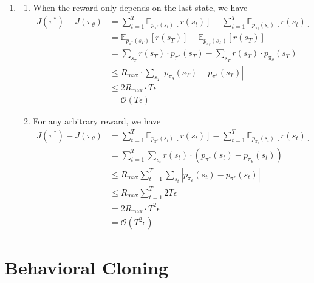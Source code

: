 \documentclass[12pt]{article}
\newcommand{\E}{\mathbb{E}}
\newcommand\abs[1]{\left| #1 \right|} %
\begin{document}
\begin{enumerate}
    \item \begin{enumerate}
      \item When the reward only depends on the last state, we have 
      \begin{align*}
        J(\pi^*) - J(\pi_\theta) &= \sum_{t=1}^T \E_{p_{\pi^*}(s_t)}[r(s_t)] - \sum_{t=1}^T \E_{p_{\pi_\theta}(s_t)}[r(s_t)] \\
        &= \E_{p_{\pi^*}(s_T)}[r(s_T)] - \E_{p_{\pi_\theta}(s_T)}[r(s_T)] \\
        &= \sum_{s_T} r(s_T) \cdot p_{\pi^*}(s_T) - \sum_{s_T} r(s_T) \cdot p_{\pi_\theta}(s_T) \\
        &\leq R_{\mathrm{max}} \cdot \sum_{s_T} \abs{p_{\pi_\theta}(s_T) - p_{\pi^*}(s_T)} \\
        &\leq 2R_{\mathrm{max}} \cdot T \epsilon \\
        &= \mathcal{O}(T\epsilon )
      \end{align*}

      \item For any arbitrary reward, we have 
      \begin{align*}
        J(\pi^*) - J(\pi_\theta) &= \sum_{t=1}^T \E_{p_{\pi^*}(s_t)}[r(s_t)] - \sum_{t=1}^T \E_{p_{\pi_\theta}(s_t)}[r(s_t)] \\
        &= \sum_{t=1}^T \sum_{s_t} r(s_t) \cdot (p_{\pi^*}(s_t) - p_{\pi_\theta}(s_t)) \\
        &\leq R_{\mathrm{max}}\sum_{t=1}^T \sum_{s_t} \abs{p_{\pi_\theta}(s_t) - p_{\pi^*}(s_t)} \\
        &\leq R_{\mathrm{max}} \sum_{t=1}^T 2T\epsilon \\
        &= 2R_{\mathrm{max}} \cdot T^2 \epsilon \\
        &= \mathcal{O}(T^2 \epsilon)
      \end{align*}
    \end{enumerate}
\end{enumerate}

\newpage

\section{Behavioral Cloning}
\end{document}
